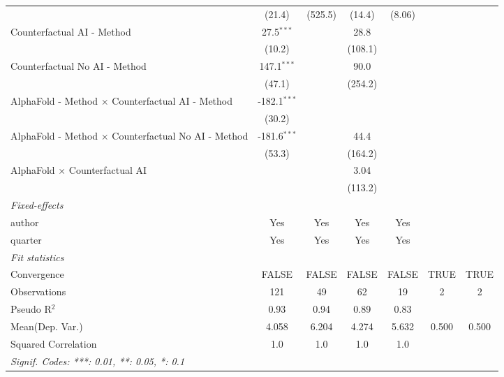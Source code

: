 \begin{tabular}{lcccccc}
                                                              & (21.4)         & (525.5) & (14.4)  & (8.06)       &      &   \\   
   Counterfactual AI - Method                                 & 27.5$^{***}$   &         & 28.8    &              &      &   \\   
                                                              & (10.2)         &         & (108.1) &              &      &   \\   
   Counterfactual No AI - Method                              & 147.1$^{***}$  &         & 90.0    &              &      &   \\   
                                                              & (47.1)         &         & (254.2) &              &      &   \\   
   AlphaFold - Method $\times$ Counterfactual AI - Method     & -182.1$^{***}$ &         &         &              &      &   \\   
                                                              & (30.2)         &         &         &              &      &   \\   
   AlphaFold - Method $\times$ Counterfactual No AI - Method  & -181.6$^{***}$ &         & 44.4    &              &      &   \\   
                                                              & (53.3)         &         & (164.2) &              &      &   \\   
   AlphaFold $\times$ Counterfactual AI                       &                &         & 3.04    &              &      &   \\   
                                                              &                &         & (113.2) &              &      &   \\   
   \midrule
   \emph{Fixed-effects}\\
   author                                                     & Yes            & Yes     & Yes     & Yes          &      & \\  
   quarter                                                    & Yes            & Yes     & Yes     & Yes          &      & \\  
   \midrule
   \emph{Fit statistics}\\
   Convergence                                                &FALSE           & FALSE   & FALSE   & FALSE        & TRUE & TRUE\\  
   Observations                                               & 121            & 49      & 62      & 19           & 2    & 2\\  
   Pseudo R$^2$                                               & 0.93           & 0.94    & 0.89    & 0.83         &      & \\  
Mean(Dep. Var.) & 4.058 & 6.204 & 4.274 & 5.632 & 0.500 & 0.500 \\
   Squared Correlation                                        & 1.0            & 1.0     & 1.0     & 1.0          &      & \\  
   \midrule \midrule
   \multicolumn{7}{l}{\emph{Signif. Codes: ***: 0.01, **: 0.05, *: 0.1}}\\
\end{tabular}
\par\endgroup
